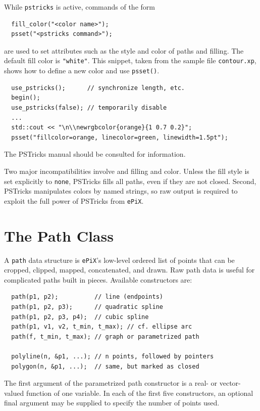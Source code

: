 \documentclass[12pt]{report}
\newcommand{\code}[1]{\texttt{#1}}
\newcommand{\filename}[1]{\texttt{#1}}
\newcommand{\ePiX}{\code{ePiX}}
\begin{document}
While \code{pstricks} is active, commands of the form
\begin{verbatim}
  fill_color("<color name>");
  psset("<pstricks command>");
\end{verbatim}
are used to set attributes such as the style and color of paths and
filling. The default fill color is \code{"white"}.  This snippet,
taken from the sample file \filename{contour.xp}, shows how to define
a new color and use \code{psset()}.
\begin{verbatim}
  use_pstricks();      // synchronize length, etc.
  begin();
  use_pstricks(false); // temporarily disable
  ...
  std::cout << "\n\\newrgbcolor{orange}{1 0.7 0.2}";
  psset("fillcolor=orange, linecolor=green, linewidth=1.5pt");
\end{verbatim}
The PSTricks manual should be consulted for information.

Two major incompatibilities involve and filling and color. Unless the
fill style is set explicitly to \code{none}, PSTricks fills all paths,
even if they are not closed. Second, PSTricks manipulates colors by
named strings, so raw output is required to exploit the full power of
PSTricks from \ePiX.


\section{The Path Class}

A \code{path} data structure is \ePiX's low-level ordered list of
points that can be cropped, clipped, mapped, concatenated, and drawn.
Raw path data is useful for complicated paths built in pieces.
Available constructors are:
\begin{verbatim}
  path(p1, p2);          // line (endpoints)
  path(p1, p2, p3);      // quadratic spline
  path(p1, p2, p3, p4);  // cubic spline
  path(p1, v1, v2, t_min, t_max); // cf. ellipse arc
  path(f, t_min, t_max); // graph or parametrized path

  polyline(n, &p1, ...); // n points, followed by pointers
  polygon(n, &p1, ...);  // same, but marked as closed
\end{verbatim}
The first argument of the parametrized path constructor is a real- or
vector-valued function of one variable. In each of the first five
constructors, an optional final argument may be supplied to specify
the number of points used. 
\end{document}
